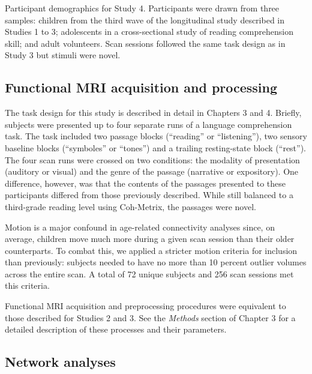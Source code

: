 \begin{table}[t]
	\renewcommand{\tabcolsep}{0.09cm}
	\centering
	
	\caption[Participant demographics for Study 4]{Participant demographics for Study 4. Participants were drawn from three samples: children from the third wave of the longitudinal study described in Studies 1 to 3; adolescents in a cross-sectional study of reading comprehension skill; and adult volunteers. Scan sessions followed the same task design as in Study 3 but stimuli were novel.}
	\label{table:ch5-participants}
\end{table}

\subsection{Functional MRI acquisition and processing}

The task design for this study is described in detail in Chapters 3 and 4. Briefly, subjects were presented up to four separate runs of a language comprehension task. The task included two passage blocks (``reading'' or ``listening''), two sensory baseline blocks (``symboles'' or ``tones'') and a trailing resting-state block (``rest''). The four scan runs were crossed on two conditions: the modality of presentation (auditory or visual) and the genre of the passage (narrative or expository). One difference, however, was that the contents of the passages presented to these participants differed from those previously described. While still balanced to a third-grade reading level using Coh-Metrix, the passages were novel. 

Motion is a major confound in age-related connectivity analyses since, on average, children move much more during a given scan session than their older counterparts. To combat this, we applied a stricter motion criteria for inclusion than previously: subjects needed to have no more than 10 percent outlier volumes across the entire scan. A total of 72 unique subjects and 256 scan sessions met this criteria. 

Functional MRI acquisition and preprocessing procedures were equivalent to those described for Studies 2 and 3. See the \textit{Methods} section of Chapter 3 for a detailed description of these processes and their parameters.

\subsection{Network analyses}

